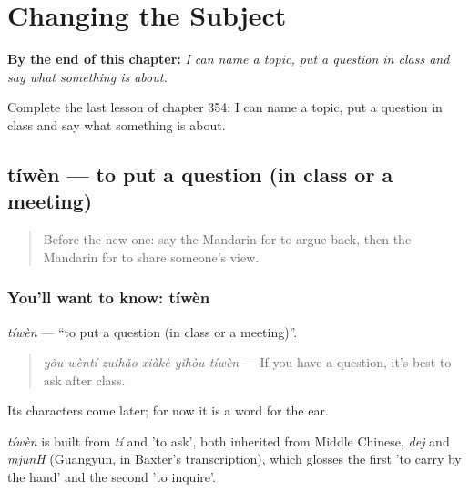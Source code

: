 
\chapter{Changing the Subject}
\label{ch:zh-changing-the-subject}

\begin{chapteropening}
\textbf{By the end of this chapter:} \emph{I can name a topic, put a question in class and say what something is about.}

Complete the last lesson of chapter 354: I can name a topic, put a question in class and say what something is about.
\end{chapteropening}

\section[tíwèn]{tíwèn — to put a question (in class or a meeting)}

\label{lesson:ZH-C354-tiwen}



\begin{quote}
Before the new one: say the Mandarin for to argue back, then the Mandarin for to share someone's view.
\end{quote}

\subsection*{You'll want to know: tíwèn}
\emph{tíwèn} — \textquotedblleft{}to put a question (in class or a meeting)\textquotedblright{}.

\begin{quote}
\emph{yǒu wèntí zuìhǎo xiàkè yǐhòu tíwèn} — If you have a question, it's best to ask after class.
\end{quote}

Its characters come later; for now it is a word for the ear.

\begin{cousinweb}
\emph{tíwèn} is built from \emph{tí} and  'to ask', both inherited from Middle Chinese, \emph{dej} and \emph{mjunH} (Guangyun, in Baxter's transcription), which glosses the first 'to carry by the hand' and the second 'to inquire'.
\end{cousinweb}

